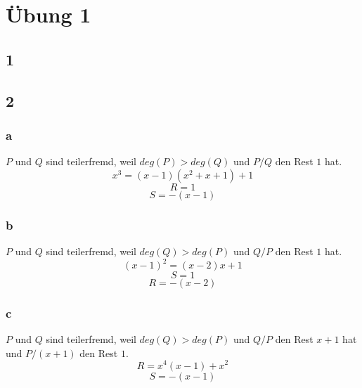 \documentclass[10pt,a4paper]{article}
\begin{document}
\section*{Übung 1}

\subsection*{1}

\subsection*{2}

\subsubsection*{a}

$P$ und $Q$ sind teilerfremd, weil $deg(P) > deg(Q)$ und $P / Q$ den Rest $1$ hat.
\begin{equation}
x^{3} = (x - 1)(x^{2} + x + 1) + 1
\end{equation}
\begin{equation}
R = 1
\end{equation}
\begin{equation}
S = -(x - 1)
\end{equation}

\subsubsection*{b}

$P$ und $Q$ sind teilerfremd, weil $deg(Q) > deg(P)$ und $Q / P$ den Rest $1$ hat.
\begin{equation}
(x - 1)^2 = (x - 2)x + 1
\end{equation}
\begin{equation}
S = 1
\end{equation}
\begin{equation}
R = -(x - 2)
\end{equation}

\subsubsection*{c}

$P$ und $Q$ sind teilerfremd, weil $deg(Q) > deg(P)$ und $Q / P$ den Rest $x + 1$ hat und $P / (x + 1)$ den Rest $1$.
\begin{equation}
R = x^4(x - 1) + x^2
\end{equation}
\begin{equation}
S = -(x - 1)
\end{equation}
\end{document}
